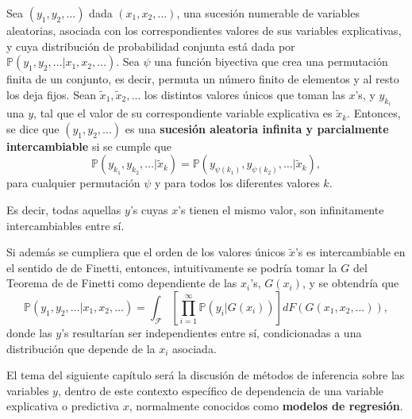 \begin{defin*}
    Sea $(y_1,y_2,...)$ dada $(x_1,x_2,...)$, una sucesi\'on numerable de variables aleatorias, asociada con los correspondientes valores de sus variables explicativas, y cuya distribuci\'on de probabilidad conjunta est\'a dada por $\mathbb{P}(y_1,y_2,\ldots|x_1,x_2,\ldots)$. Sea $\psi$ una funci\'on biyectiva que crea una permutaci\'on finita de un conjunto, es decir, permuta un n\'umero finito de elementos y al resto los deja fijos. Sean $\tilde{x}_1,\tilde{x}_2,\ldots$ los distintos valores \'unicos que toman las $x$'s, y $y_{k_i}$ una $y$, tal que el valor de su correspondiente variable explicativa es $\tilde{x}_k$.  
    Entonces, se dice que $(y_1,y_2,\ldots)$ es una \textbf{sucesi\'on aleatoria infinita y parcialmente intercambiable} si se cumple que 
    \begin{equation*}
        \mathbb{P}(y_{k_1},y_{k_2},\ldots|\tilde{x}_k) = \mathbb{P}(y_{\psi(k_1)},y_{\psi(k_2)},\ldots|\tilde{x}_k),
    \end{equation*}
    para cualquier permutaci\'on $\psi$ y para todos los diferentes valores $k$.
    
    Es decir, todas aquellas $y$'s cuyas $x$'s tienen el mismo valor, son infinitamente intercambiables entre s\'i. 
\end{defin*}

Si adem\'as se cumpliera que el orden de los valores \'unicos $\tilde{x}$'s es intercambiable en el sentido de de Finetti, entonces, intuitivamente se podr\'ia tomar la $G$ del Teorema de de Finetti como dependiente de las $x_i$'s, $G(x_i)$, y se obtendr\'ia que
\begin{equation*}
    \mathbb{P}(y_1,y_2,\ldots|x_1,x_2,\ldots) =
    \int_{\mathcal{F}}\left[\prod_{i=1}^\infty \mathbb{P}(y_i|G(x_i))\right]dF(G(x_1,x_2,\ldots)),
\end{equation*}
donde las $y$'s resultar\'ian ser independientes entre s\'i, condicionadas a una distribuci\'on que depende de la $x_i$ asociada.

El tema del siguiente cap\'itulo ser\'a la discusi\'on de m\'etodos de inferencia sobre las variables $y$, dentro de este contexto espec\'ifico de dependencia de una variable explicativa o predictiva $x$, normalmente conocidos como \textbf{modelos de regresi\'on}.

\newpage